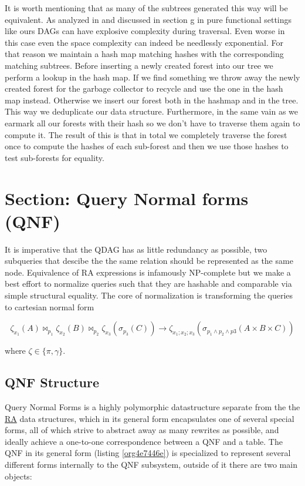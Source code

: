 It is worth mentioning that as many of the subtrees generated this way
will be equivalent. As analyzed in
\cite{selsamSealingPointerbasedOptimizations2020} and discussed in
section g in pure functional settings like ours DAGs can
have explosive complexity during traversal. Even worse in this case
even the space complexity can indeed be needlessly exponential. For
that reason we maintain a hash map matching hashes with the
corresponding matching subtrees. Before inserting a newly created
forest into our tree we perform a lookup in the hash map. If we find
something we throw away the newly created forest for the garbage
collector to recycle and use the one in the hash map
instead. Otherwise we insert our forest both in the hashmap and in the
tree. This way we deduplicate our data structure. Furthermore, in the
same vain as \cite{selsamSealingPointerbasedOptimizations2020} we
earmark all our forests with their hash so we don't have to traverse
them again to compute it. The result of this is that in total we
completely traverse the forest once to compute the hashes of each
sub-forest and then we use those hashes to test sub-forests for
equality.




\section{Section: Query Normal forms (QNF)}
\label{sec:org9e7f455}
It is imperative that the QDAG has as little redundancy as possible,
two subqueries that descibe the the same relation should be
represented as the same node. Equivalence of RA expressions is
infamously NP-complete
\cite{sagivEquivalencesRelationalExpressions1980} but we make a best
effort to normalize queries such that they are hashable and comparable
via simple structural equality. The core of normalization is
transforming the queries to cartesian normal form

\[
  \zeta_{x_1}(A) \Join_{p_1} \zeta_{x_2}(B) \Join_{p_2} \zeta_{x_3} (\sigma_{p_3}(C)) \to \zeta_{x_1;x_2;x_3}(\sigma_{p_1 \land p_2 \land p3}(A \times B \times C))
\]

where \(\zeta \in \{\pi,\gamma\}\).


\subsection{QNF Structure}
\label{sec:org1912b6b}
Query Normal Forms is a highly polymorphic datastructure separate from
the the \hyperref[sec:relational_algebra_semantics]{RA} data structures, which in its general form encapsulates one
of several special forms, all of which strive to abstract away as many
rewrites as possible, and ideally achieve a one-to-one correspondence
between a QNF and a table. The QNF in its general form (listing
\ref{org4e7446e}) is specialized to represent several different forms
internally to the QNF subsystem, outside of it there are two main
objects:

